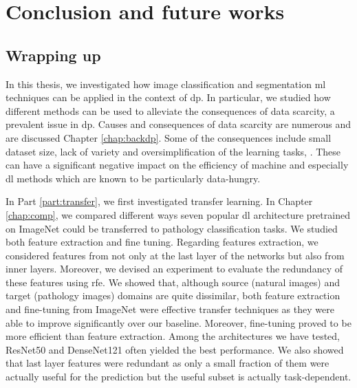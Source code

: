 \chapter{Conclusion and future works}
\label{chap:conclusions}

\section{Wrapping up}
\label{sec:concl:wrappingup}

In this thesis, we investigated how image classification and segmentation \acrlong{ml} techniques can be applied in the context of \acrlong{dp}. In particular, we studied how different methods can be used to alleviate the consequences of data scarcity, a prevalent issue in \acrlong{dp}. Causes and consequences of data scarcity are numerous and are discussed Chapter \ref{chap:backdp}. Some of the consequences include small dataset size, lack of variety and oversimplification of the learning tasks, \etc. These can have a significant negative impact on the efficiency of machine and especially \acrlong{dl} methods which are known to be particularly data-hungry. 

In Part \ref{part:transfer}, we first investigated transfer learning. In Chapter \ref{chap:comp}, we compared different ways seven popular \acrlong{dl} architecture pretrained on ImageNet could be transferred to pathology classification tasks. We studied both feature extraction and fine tuning. Regarding features extraction, we considered features from not only at the last layer of the networks but also from inner layers. Moreover, we devised an experiment to evaluate the redundancy of these features using \acrlong{rfe}. We showed that, although source (\ie natural images) and target (\ie pathology images) domains are quite dissimilar, both feature extraction and fine-tuning from ImageNet were effective transfer techniques as they were able to improve significantly over our baseline. Moreover, fine-tuning proved to be more efficient than feature extraction. Among the architectures we have tested, ResNet50 and DenseNet121 often yielded the best performance. We also showed that last layer features were redundant as only a small fraction of them were actually useful for the prediction but the useful subset is actually task-dependent. 

